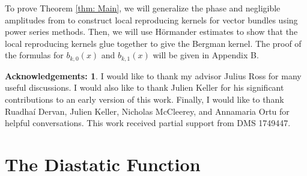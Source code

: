 \documentclass{amsart}
\theoremstyle{definition}
\newtheorem*{ack*}{Acknowledgements:}
\theoremstyle{remark}
\numberwithin{equation}{section}
\begin{document}
To prove Theorem \ref{thm: Main}, we will generalize the phase and negligible amplitudes from \cite{BBS} to construct local reproducing kernels for vector bundles using power series methods. Then, we will use H\"ormander estimates to show that the local reproducing kernels glue together to give the Bergman kernel. The proof of the formulas for $b_{k,0}(x)$ and $b_{k,1}(x)$ will be given in Appendix B.






\begin{ack*}
I would like to thank my advisor Julius Ross for many useful discussions. I would also like to thank Julien Keller for his significant contributions to an early version of this work. Finally, I would like to thank Ruadha\'i Dervan, Julien Keller, Nicholas McCleerey, and Annamaria Ortu for helpful conversations. This work received partial support from DMS 1749447.
\end{ack*}






















\section{The Diastatic Function}
\end{document}
